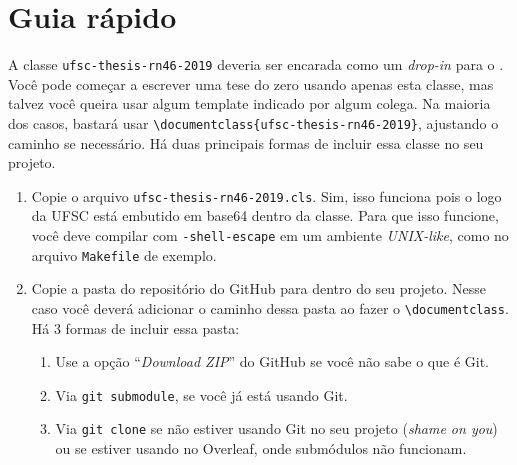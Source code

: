 \documentclass[embeddedlogo]{../ufsc-thesis-rn46-2019}
\newcommand{\lacmd}[1]{\texttt{\textbackslash{}#1}}
\begin{document}
\section{Guia rápido}
\label{sec:quick}

A classe \texttt{ufsc-thesis-rn46-2019} deveria ser encarada como um
\emph{drop-in} para o \abnTeX. Você pode começar a escrever uma tese do zero
usando apenas esta classe, mas talvez você queira usar algum template indicado
por algum colega. Na maioria dos casos, bastará usar
\lacmd{documentclass\{ufsc-thesis-rn46-2019\}}, ajustando o caminho se necessário.
Há duas principais formas de incluir essa classe no seu projeto.

\begin{enumerate}
  \item Copie o arquivo \texttt{ufsc-thesis-rn46-2019.cls}. Sim, isso funciona
      pois o logo da UFSC está embutido em base64 dentro da classe. Para que
        isso funcione, você deve compilar com \texttt{-shell-escape} em um
        ambiente \textit{UNIX-like}, como no arquivo \texttt{Makefile} de
        exemplo.
  \item Copie a pasta do repositório do GitHub para dentro do seu projeto.
      Nesse caso você deverá adicionar o caminho dessa pasta ao fazer o
        \lacmd{documentclass}. Há 3 formas de incluir essa pasta:
  \begin{enumerate}
    \item Use a opção ``\emph{Download ZIP}'' do GitHub se você não sabe o que
        é Git.
    \item Via \texttt{git submodule}, se você já está usando Git.
    \item Via \texttt{git clone} se não estiver usando Git no seu projeto
        (\emph{shame on you}) ou se estiver usando no Overleaf, onde submódulos
          não funcionam.
    \end{enumerate}
\end{enumerate}
\end{document}
